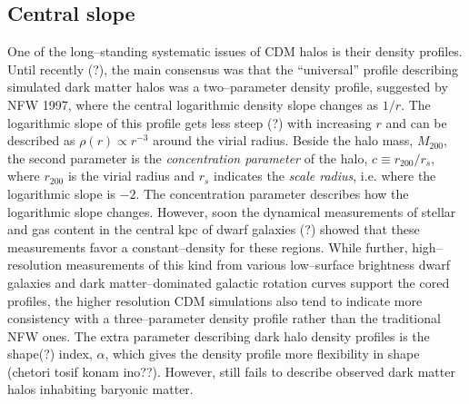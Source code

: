 \documentclass[paper=a4, fontsize=11pt]{scrartcl} %
\numberwithin{equation}{section} %
\numberwithin{figure}{section} %
\numberwithin{table}{section} %
\begin{document}
\subsection{Central slope}
One of the long--standing systematic issues of CDM halos is their density profiles. Until recently (?), the main consensus was that the ``universal'' profile describing simulated dark matter halos was a two--parameter density profile, suggested by NFW 1997, where the central logarithmic density slope changes as $1/r$. The logarithmic slope of this profile gets less steep (?) with increasing $r$ and can be described as $\rho(r) \propto r^{-3}$ around the virial radius. Beside the halo mass, $M_{200}$, the second parameter is the \emph{concentration parameter} of the halo, $c \equiv r_{200}/r_s$, where $r_{200}$ is the virial radius and $r_s$ indicates the \emph{scale radius}, i.e. where the logarithmic slope is $-2$. The concentration parameter describes how the logarithmic slope changes. However, soon the dynamical measurements of stellar and gas content in the central kpc of dwarf galaxies (?) showed that these measurements favor a constant--density for these regions. While further, high--resolution measurements of this kind from various low--surface brightness dwarf galaxies and dark matter--dominated galactic rotation curves support the cored profiles, the higher resolution CDM simulations also tend to indicate more consistency with a three--parameter density profile rather than the traditional NFW ones. The extra parameter describing dark halo density profiles is the shape(?) index, $\alpha$, which gives the density profile more flexibility in shape (chetori tosif konam ino??). However, still fails to describe observed dark matter halos inhabiting baryonic matter. 
\end{document}
